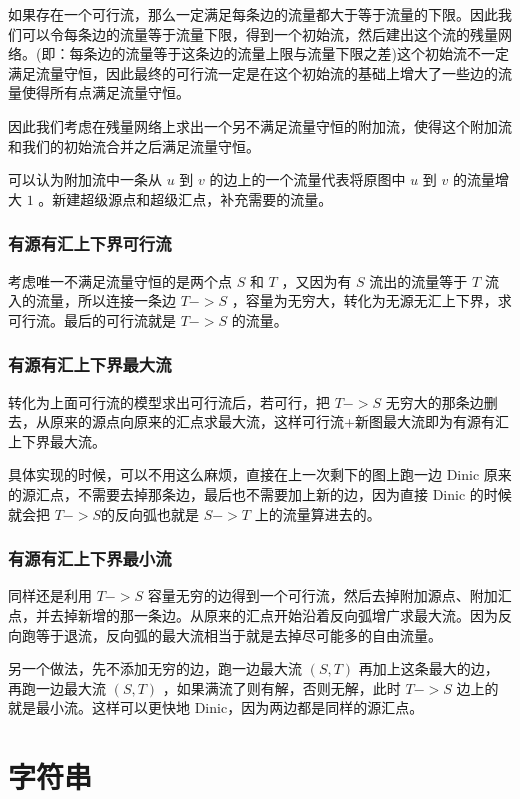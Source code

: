 \documentclass[UTF-8]{ctexart}
\begin{document}
			如果存在一个可行流，那么一定满足每条边的流量都大于等于流量的下限。因此我们可以令每条边的流量等于流量下限，得到一个初始流，然后建出这个流的残量网络。(即：每条边的流量等于这条边的流量上限与流量下限之差)这个初始流不一定满足流量守恒，因此最终的可行流一定是在这个初始流的基础上增大了一些边的流量使得所有点满足流量守恒。  
			
			因此我们考虑在残量网络上求出一个另不满足流量守恒的附加流，使得这个附加流和我们的初始流合并之后满足流量守恒。
			
			可以认为附加流中一条从  $u$ 到 $v$ 的边上的一个流量代表将原图中 $u$ 到 $v$ 的流量增大 $1$ 。新建超级源点和超级汇点，补充需要的流量。
		
			\subsubsection{有源有汇上下界可行流}
			
			考虑唯一不满足流量守恒的是两个点 $S$ 和 $T$ ，又因为有 $S$ 流出的流量等于 $T$ 流入的流量，所以连接一条边 $T->S$ ，容量为无穷大，转化为无源无汇上下界，求可行流。最后的可行流就是 $T->S$ 的流量。
			
			\subsubsection{有源有汇上下界最大流}
			
			转化为上面可行流的模型求出可行流后，若可行，把 $T->S$ 无穷大的那条边删去，从原来的源点向原来的汇点求最大流，这样可行流+新图最大流即为有源有汇上下界最大流。  
			
			具体实现的时候，可以不用这么麻烦，直接在上一次剩下的图上跑一边 Dinic 原来的源汇点，不需要去掉那条边，最后也不需要加上新的边，因为直接 Dinic 的时候就会把 $T->S$的反向弧也就是 $S->T$ 上的流量算进去的。
			
			\subsubsection{有源有汇上下界最小流}
			
			同样还是利用 $T->S$ 容量无穷的边得到一个可行流，然后去掉附加源点、附加汇点，并去掉新增的那一条边。从原来的汇点开始沿着反向弧增广求最大流。因为反向跑等于退流，反向弧的最大流相当于就是去掉尽可能多的自由流量。  
			
			另一个做法，先不添加无穷的边，跑一边最大流 $(S,T)$ 再加上这条最大的边，再跑一边最大流 $(S,T)$ ，如果满流了则有解，否则无解，此时 $T->S$ 边上的就是最小流。这样可以更快地 Dinic，因为两边都是同样的源汇点。
	\newpage
	\section{字符串}
\end{document}
